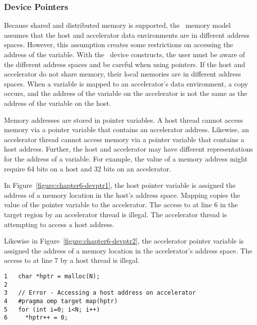 \subsubsection{Device Pointers}
\label{ssec:06.device-pointers}

Because shared and distributed memory is supported, the \OMP\ memory model
assumes that the host and accelerator data environments are in different
address spaces.  However, this assumption creates some restrictions on
accessing the address of the variable.
With the \OMP\ device constructs, the user must be aware of the different
address spaces and be careful when using pointers.  
If the host and accelerator do not share memory, their local memories are in
different address spaces.  When a variable is mapped to an accelerator's data
environment, a copy occurs, and the address of the variable on the accelerator
is not the same as the address of the variable on the host.

Memory addresses are stored in pointer variables.  A host thread cannot access
memory via a pointer variable that contains an accelerator address.  Likewise,
an accelerator thread cannot access memory via a pointer variable that contains
a host address.  
Further, the host and accelerator may have different representations for the
address of a variable.  For example, the value of a memory address might
require 64 bits on a host and 32 bits on an accelerator.

In Figure~\ref{figure:chapter6-devptr1}, the host pointer variable  is
assigned the address of a memory location in the host's address space.  
Mapping  copies the value of the pointer variable to the accelerator. The
access to  at line $6$ in the target region by an accelerator thread is illegal.
The accelerator thread is attempting to access a host address.

Likewise in Figure~\ref{figure:chapter6-devptr2}, the accelerator pointer
variable  is assigned the address of a memory location in the
accelerator's address space.  The access to  at line $7$ by a host thread is illegal.

\begin{figure*}[!tb]
\begin{verbatim}
1   char *hptr = malloc(N);
2
3   // Error - Accessing a host address on accelerator
4   #pragma omp target map(hptr)
5   for (int i=0; i<N; i++)
6     *hptr++ = 0;
\end{verbatim}
\caption{ \textbf {Illegal access of a host memory address } -- \small
          A pointer variable containing a host memory address cannot be
          de-referenced by an accelerator thread.
         }
\label{figure:chapter6-devptr1}
\end{figure*}

